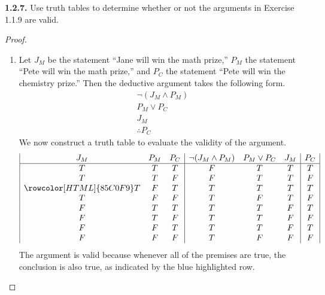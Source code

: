 \documentclass[12pt]{amsart}
\newenvironment{statement}[1]{\smallskip\noindent\color[rgb]{.6627, .3529, .6314} {\bf #1.}}{}
\theoremstyle{definition}
\theoremstyle{remark}
\begin{document}
\begin{statement}{1.2.7}
Use truth tables to determine whether or not the arguments in Exercise 1.1.9 are valid.
\end{statement}

\begin{proof}
\hfill
\begin{enumerate}
	\item Let $J_M$ be the statement ``Jane will win the math prize,'' $P_M$ the statement ``Pete will win the math prize,'' and $P_C$ the statement ``Pete will win the chemistry prize.''
	Then the deductive argument takes the following form.
	\begin{equation*}
		\begin{array}{l}
			\neg (J_M \wedge P_M) \\
			P_M \vee P_C \\
			J_M \\
			\hline
			\therefore P_C
		\end{array}
	\end{equation*}
	We now construct a truth table to evaluate the validity of the argument.
	\begin{equation*}
		\begin{array}{| c c c | c c c | c |}
			J_M & P_M & P_C & \neg (J_M \wedge P_M) & P_M \vee P_C & J_M & P_C \\
			\hline
			T & T & T & F & T & T & T \\
			T & T & F & F & T & T & F \\
			\rowcolor[HTML]{85C0F9} T & F & T & T & T & T & T \\
			T & F & F & T & F & T & F \\
			F & T & T & T & T & F & T \\
			F & T & F & T & T & F & F \\
			F & F & T & T & T & F & T \\
			F & F & F & T & F & F & F
		\end{array}
	\end{equation*}
	The argument is valid because whenever all of the premises are true, the conclusion is also true, as indicated by the blue highlighted row.
	

\end{enumerate}
\end{proof}
\end{document}
